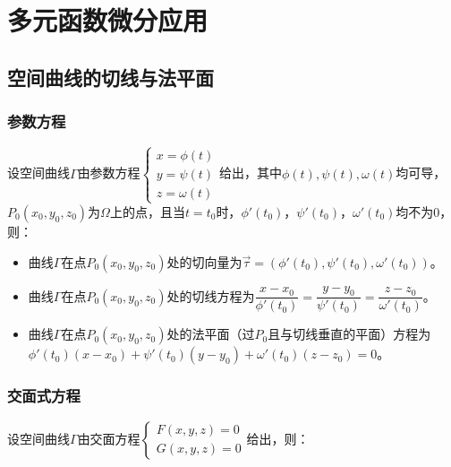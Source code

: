 \documentclass[UTF8, 12pt]{ctexart}
\begin{document}
\section{多元函数微分应用}

\subsection{空间曲线的切线与法平面}

\subsubsection{参数方程}

设空间曲线$\varGamma$由参数方程$\left\{\begin{array}{l}
    x=\phi(t) \\
    y=\psi(t) \\
    z=\omega(t)
\end{array}\right.$给出，其中$\phi(t),\psi(t),\omega(t)$均可导，$P_0(x_0,y_0,z_0)$为$\varOmega$上的点，且当$t=t_0$时，$\phi'(t_0)$，$\psi'(t_0)$，$\omega'(t_0)$均不为0，则：

\begin{itemize}
    \item 曲线$\varGamma$在点$P_0(x_0,y_0,z_0)$处的切向量为$\vec{\tau}=(\phi'(t_0),\psi'(t_0),\omega'(t_0))$。
    \item 曲线$\varGamma$在点$P_0(x_0,y_0,z_0)$处的切线方程为$\dfrac{x-x_0}{\phi'(t_0)}=\dfrac{y-y_0}{\psi'(t_0)}=\dfrac{z-z_0}{\omega'(t_0)}$。
    \item 曲线$\varGamma$在点$P_0(x_0,y_0,z_0)$处的法平面（过$P_0$且与切线垂直的平面）方程为$\phi'(t_0)(x-x_0)+\psi'(t_0)(y-y_0)+\omega'(t_0)(z-z_0)=0$。
\end{itemize}

\subsubsection{交面式方程}

设空间曲线$\varGamma$由交面方程$\left\{\begin{array}{l}
    F(x,y,z)=0 \\
    G(x,y,z)=0
\end{array}\right.$给出，则：
\end{document}
